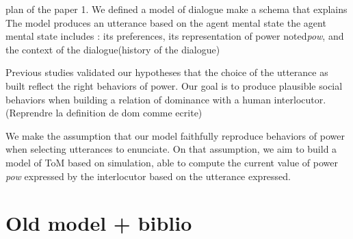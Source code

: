 \documentclass{llncs}
\begin{document}
	plan of the paper
	1. We defined a model of dialogue make a schema that explains 
	The model produces an utterance based on the agent mental state
	the agent mental state includes : its preferences, its representation of power noted\emph{pow}, and the context of the dialogue(history of the dialogue)
	
	Previous studies validated our hypotheses that the choice of the utterance as built reflect the right behaviors of power.
	Our goal is to produce plausible social behaviors when building a relation of dominance with a human interlocutor. 
	(Reprendre la definition de dom comme ecrite) 
	
	We make the assumption that our model faithfully reproduce behaviors of power when selecting utterances to enunciate. On that assumption, we aim to build a model of ToM based on simulation, able to compute the current value of power \emph{pow} expressed by the interlocutor based on the utterance expressed. 
	
	\section{Old model + biblio}
	
\end{document}
